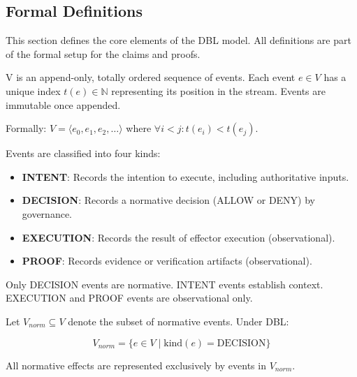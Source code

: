 \subsection{Formal Definitions}

This section defines the core elements of the DBL model. All definitions are part of the formal setup for the claims and proofs.

\begin{definition}
V is an append-only, totally ordered sequence of events. Each event $e \in V$ has a unique index $t(e) \in \mathbb{N}$ representing its position in the stream. Events are immutable once appended.

Formally: $V = \langle e_0, e_1, e_2, \ldots \rangle$ where $\forall i < j: t(e_i) < t(e_j)$.
\end{definition}

\begin{definition}
Events are classified into four kinds:
\begin{itemize}
  \item \textbf{INTENT}: Records the intention to execute, including authoritative inputs.
  \item \textbf{DECISION}: Records a normative decision (ALLOW or DENY) by governance.
  \item \textbf{EXECUTION}: Records the result of effector execution (observational).
  \item \textbf{PROOF}: Records evidence or verification artifacts (observational).
\end{itemize}

Only DECISION events are normative. INTENT events establish context. EXECUTION and PROOF events are observational only.
\end{definition}

\begin{definition}
Let $V_{norm} \subseteq V$ denote the subset of normative events. Under DBL:

$$V_{norm} = \{e \in V \mid \text{kind}(e) = \text{DECISION}\}$$

All normative effects are represented exclusively by events in $V_{norm}$.
\end{definition}

